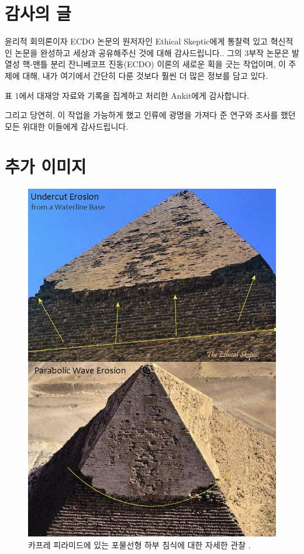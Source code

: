 \documentclass[10pt,twocolumn,letterpaper]{article}
\begin{document}
\section{감사의 글}

윤리적 회의론이자 ECDO 논문의 원저자인 Ethical Skeptic에게 통찰력 있고 혁신적인 논문을 완성하고 세상과 공유해주신 것에 대해 감사드립니다.. 그의 3부작 논문\cite{1}은 발열성 핵-맨틀 분리 잔니베코프 진동(ECDO) 이론의 새로운 획을 긋는 작업이며, 이 주제에 대해, 내가 여기에서 간단히 다룬 것보다 훨씬 더 많은 정보를 담고 있다.

표 1에서 대재앙 자료와 기록을 집계하고 처리한 Ankit에게 감사합니다.

그리고 당연히, 이 작업을 가능하게 했고 인류에 광명을 가져다 준 연구와 조사를 했던 모든 위대한 이들에게 감사드립니다.

\clearpage
\twocolumn

\section{추가 이미지}

\begin{figure}[H]
\begin{center}
   \includegraphics[width=1\linewidth]{wave.jpg}
\end{center}
   \caption{카프레 피라미드에 있는 포물선형 하부 침식에 대한 자세한 관찰 \cite{27}.}
\label{fig:17}
\label{fig:onecol}
\end{figure}
\end{document}
